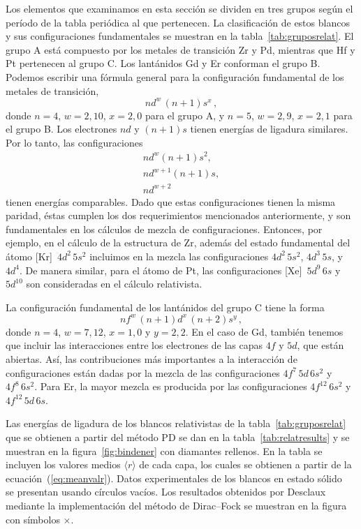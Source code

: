 Los elementos que examinamos en esta sección se dividen en tres grupos 
según el período de la tabla periódica al que pertenecen. La 
clasificación de estos blancos y sus configuraciones fundamentales se
muestran en la tabla~\ref{tab:gruposrelat}. El grupo A está compuesto 
por los metales de transición Zr y Pd, mientras que Hf y Pt pertenecen 
al grupo C. Los lantánidos Gd y Er conforman el grupo B. 
Podemos escribir una fórmula general para la configuración fundamental 
de los metales de transición, 
\begin{equation}
nd^w\,(n+1)s^x\,,
\end{equation}
donde $n=4$, $w=2,10$, $x=2,0$ para el grupo A, y $n=5$, $w=2,9$, 
$x=2,1$ para el grupo B. Los electrones $nd$ y $(n+1)s$ tienen energías 
de ligadura similares. Por lo tanto, las configuraciones 
\begin{gather}
nd^w(n+1)s^2, \\
nd^{w+1}(n+1)s, \\
nd^{w+2}
\end{gather}
tienen energías comparables. Dado que estas configuraciones tienen la 
misma paridad, éstas cumplen los dos requerimientos mencionados 
anteriormente, y son fundamentales en los cálculos de mezcla de 
configuraciones. Entonces, por ejemplo, en el cálculo de la estructura 
de Zr, además del estado fundamental del átomo [Kr]~$4d^2\,5s^2$ 
incluimos en la mezcla las configuraciones $4d^2\,5s^2$, $4d^3\,5s$, y 
$4d^4$. De manera similar, para el átomo de Pt, las configuraciones
[Xe]~$5d^9\,6s$ y $5d^{10}$ son consideradas en el cálculo relativista.

La configuración fundamental de los lantánidos del grupo C tiene la 
forma 
\begin{equation}
nf^w\,(n+1)d^x\,(n+2)s^y\,,
\end{equation}
donde $n=4$, $w=7,12$, $x=1,0$ y $y=2,2$. En el caso de Gd, también 
tenemos que incluir las interacciones entre los electrones de las capas
$4f$ y $5d$, que están abiertas. Así, las contribuciones más 
importantes a la interacción de configuraciones están dadas por la 
mezcla de las configuraciones $4f^7\,5d\,6s^2$ y $4f^8\,6s^2$.
Para Er, la mayor mezcla es producida por las configuraciones 
$4f^{12}\,6s^2$ y $4f^{12}\,5d\,6s$.

Las energías de ligadura de los blancos relativistas de la 
tabla~\ref{tab:gruposrelat} que se obtienen a partir del método PD se 
dan en la tabla~\ref{tab:relatresults} y se muestran en la 
figura~\ref{fig:bindener} con diamantes rellenos. En la tabla se 
incluyen los valores medios $\langle r\rangle$ de cada capa, los cuales 
se obtienen a partir de la ecuación~(\ref{eq:meanvalr}). Datos 
experimentales de los blancos en estado sólido~\cite{Williams:95} se 
presentan usando círculos vacíos. Los resultados obtenidos por 
Desclaux~\cite{Desclaux:73} mediante la implementación del método 
de Dirac--Fock se muestran en la figura con símbolos $\times$.


